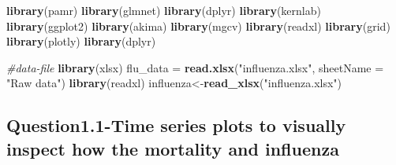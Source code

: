 \documentclass[]{article}
\newenvironment{Shaded}{\begin{snugshade}}{\end{snugshade}}
\newcommand{\KeywordTok}[1]{\textcolor[rgb]{0.13,0.29,0.53}{\textbf{#1}}}
\newcommand{\DataTypeTok}[1]{\textcolor[rgb]{0.13,0.29,0.53}{#1}}
\newcommand{\StringTok}[1]{\textcolor[rgb]{0.31,0.60,0.02}{#1}}
\newcommand{\CommentTok}[1]{\textcolor[rgb]{0.56,0.35,0.01}{\textit{#1}}}
\newcommand{\OperatorTok}[1]{\textcolor[rgb]{0.81,0.36,0.00}{\textbf{#1}}}
\newcommand{\NormalTok}[1]{#1}
\begin{document}
\begin{Shaded}
\begin{Highlighting}[]
\KeywordTok{library}\NormalTok{(pamr)}
\KeywordTok{library}\NormalTok{(glmnet)}
\KeywordTok{library}\NormalTok{(dplyr)}
\KeywordTok{library}\NormalTok{(kernlab)}
\KeywordTok{library}\NormalTok{(ggplot2)}
\KeywordTok{library}\NormalTok{(akima)}
\KeywordTok{library}\NormalTok{(mgcv)}
\KeywordTok{library}\NormalTok{(readxl)}
\KeywordTok{library}\NormalTok{(grid)}
\KeywordTok{library}\NormalTok{(plotly)}
\KeywordTok{library}\NormalTok{(dplyr)}
\end{Highlighting}
\end{Shaded}

\begin{Shaded}
\begin{Highlighting}[]
\CommentTok{#data-file}
\KeywordTok{library}\NormalTok{(xlsx)}
\NormalTok{flu_data =}\StringTok{ }\KeywordTok{read.xlsx}\NormalTok{(}\StringTok{"influenza.xlsx"}\NormalTok{, }\DataTypeTok{sheetName =} \StringTok{"Raw data"}\NormalTok{)}
\KeywordTok{library}\NormalTok{(readxl)}
\NormalTok{influenza<-}\KeywordTok{read_xlsx}\NormalTok{(}\StringTok{"influenza.xlsx"}\NormalTok{)}
\end{Highlighting}
\end{Shaded}

\subsection{Question1.1-Time series plots to visually inspect how the
mortality and
influenza}\label{question1.1-time-series-plots-to-visually-inspect-how-the-mortality-and-influenza}

\begin{Shaded}
\end{Shaded}
\end{document}
